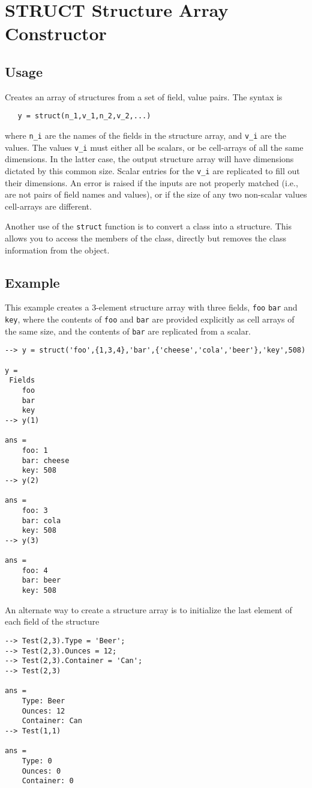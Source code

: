 \section{STRUCT Structure Array Constructor}

\subsection{Usage}

Creates an array of structures from a set of field, value pairs.
The syntax is
\begin{verbatim}
   y = struct(n_1,v_1,n_2,v_2,...)
\end{verbatim}
where \verb|n_i| are the names of the fields in the structure array, and
\verb|v_i| are the values.  The values \verb|v_i| must either all be
scalars, or be cell-arrays of all the same dimensions.  In the latter 
case, the
output structure array will have dimensions dictated by this common
size.  Scalar entries for the \verb|v_i| are replicated to fill out
their dimensions. An error is raised if the inputs are not properly matched (i.e., are
not pairs of field names and values), or if the size of any two non-scalar
values cell-arrays are different.

Another use of the \verb|struct| function is to convert a class into a 
structure.  This allows you to access the members of the class, directly 
but removes the class information from the object.

\subsection{Example}

This example creates a 3-element structure array with three fields, \verb|foo|
\verb|bar| and \verb|key|, where the contents of \verb|foo| and \verb|bar| are provided 
explicitly as cell arrays of the same size, and the contents of \verb|bar| 
are replicated from a scalar.
\begin{verbatim}
--> y = struct('foo',{1,3,4},'bar',{'cheese','cola','beer'},'key',508)

y = 
 Fields
    foo
    bar
    key
--> y(1)

ans = 
    foo: 1
    bar: cheese
    key: 508
--> y(2)

ans = 
    foo: 3
    bar: cola
    key: 508
--> y(3)

ans = 
    foo: 4
    bar: beer
    key: 508
\end{verbatim}

An alternate way to create a structure array is to initialize the last
element of each field of the structure
\begin{verbatim}
--> Test(2,3).Type = 'Beer';
--> Test(2,3).Ounces = 12;
--> Test(2,3).Container = 'Can';
--> Test(2,3)

ans = 
    Type: Beer
    Ounces: 12
    Container: Can
--> Test(1,1)

ans = 
    Type: 0
    Ounces: 0
    Container: 0
\end{verbatim}
